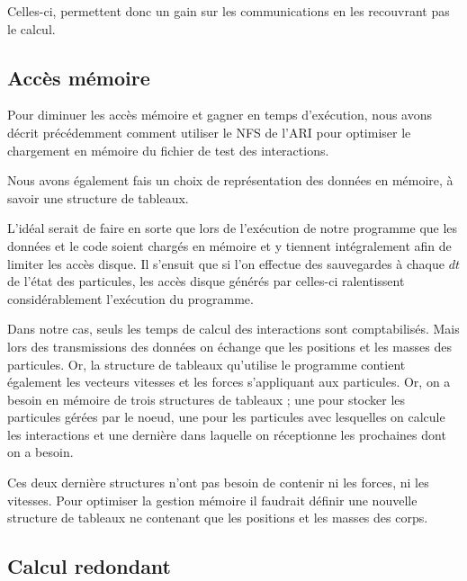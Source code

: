 \par Celles-ci, permettent donc un gain sur les communications en les recouvrant pas le calcul.\\

\subsection{Accès mémoire}

\par Pour diminuer les accès mémoire et gagner en temps d'exécution, nous avons décrit précédemment
comment utiliser le NFS de l'ARI pour optimiser le chargement en mémoire du fichier de test
des interactions.\\

\par Nous avons également fais un choix de représentation des données en mémoire, à savoir une structure 
de tableaux.\\

\par L'idéal serait de faire en sorte que lors de l'exécution de notre programme que les données 
et le code soient chargés en mémoire et y tiennent intégralement afin de limiter les accès disque.
Il s'ensuit que si l'on effectue des sauvegardes à chaque $dt$ de l'état des particules, les 
accès disque générés par celles-ci ralentissent considérablement l'exécution du programme.\\

\par Dans notre cas, seuls les temps de calcul des interactions sont comptabilisés. Mais lors des 
transmissions des données on échange que les positions et les masses des particules. Or, la structure
de tableaux qu'utilise le programme contient également les vecteurs vitesses et les forces s'appliquant 
aux particules. Or, on a besoin en mémoire de trois structures de tableaux ; une pour stocker 
les particules gérées par le noeud, une pour les particules avec lesquelles on calcule les 
interactions et une dernière dans laquelle on réceptionne les prochaines dont on a besoin.\\

\par Ces deux dernière structures n'ont pas besoin de contenir ni les forces, ni les vitesses.
Pour optimiser la gestion mémoire il faudrait définir une nouvelle structure de tableaux 
ne contenant que les positions et les masses des corps.

\subsection{Calcul redondant}

